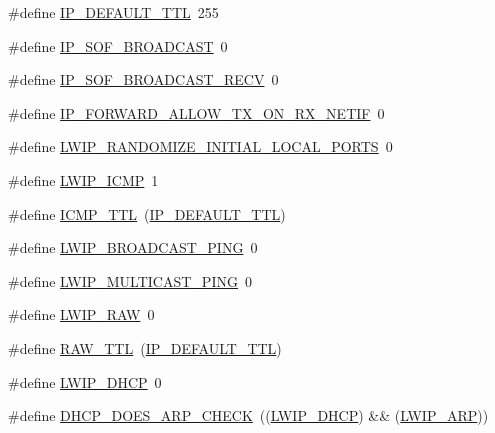 \begin{DoxyCompactItemize}
\#define \hyperlink{group__lwip__opts__ipv4_ga556b9b58fd02c0fdd126791baef77411}{I\+P\+\_\+\+D\+E\+F\+A\+U\+L\+T\+\_\+\+T\+TL}~255
\item 
\#define \hyperlink{group__lwip__opts__ipv4_ga0b2c993fd940f5774108298933310384}{I\+P\+\_\+\+S\+O\+F\+\_\+\+B\+R\+O\+A\+D\+C\+A\+ST}~0
\item 
\#define \hyperlink{group__lwip__opts__ipv4_ga0f1fbf42d3344bf87cd056d48ddca3db}{I\+P\+\_\+\+S\+O\+F\+\_\+\+B\+R\+O\+A\+D\+C\+A\+S\+T\+\_\+\+R\+E\+CV}~0
\item 
\#define \hyperlink{group__lwip__opts__ipv4_ga9e761df07c4e93901858741d4771dbc7}{I\+P\+\_\+\+F\+O\+R\+W\+A\+R\+D\+\_\+\+A\+L\+L\+O\+W\+\_\+\+T\+X\+\_\+\+O\+N\+\_\+\+R\+X\+\_\+\+N\+E\+T\+IF}~0
\item 
\#define \hyperlink{group__lwip__opts__ipv4_gafd988b31749b30c65009c8ddf6c0a58d}{L\+W\+I\+P\+\_\+\+R\+A\+N\+D\+O\+M\+I\+Z\+E\+\_\+\+I\+N\+I\+T\+I\+A\+L\+\_\+\+L\+O\+C\+A\+L\+\_\+\+P\+O\+R\+TS}~0
\item 
\#define \hyperlink{group__lwip__opts__icmp_gae4d45345c3ab8e5a355fda1d8d24fca6}{L\+W\+I\+P\+\_\+\+I\+C\+MP}~1
\item 
\#define \hyperlink{group__lwip__opts__icmp_gae1533f2bc39a5843989909555f6ce0cf}{I\+C\+M\+P\+\_\+\+T\+TL}~(\hyperlink{group__lwip__opts__ipv4_ga556b9b58fd02c0fdd126791baef77411}{I\+P\+\_\+\+D\+E\+F\+A\+U\+L\+T\+\_\+\+T\+TL})
\item 
\#define \hyperlink{group__lwip__opts__icmp_ga8088cb56d1a84fe554b11bc15d84b2b9}{L\+W\+I\+P\+\_\+\+B\+R\+O\+A\+D\+C\+A\+S\+T\+\_\+\+P\+I\+NG}~0
\item 
\#define \hyperlink{group__lwip__opts__icmp_gaf77baf0a83b04312eab4c006ef229661}{L\+W\+I\+P\+\_\+\+M\+U\+L\+T\+I\+C\+A\+S\+T\+\_\+\+P\+I\+NG}~0
\item 
\#define \hyperlink{group__lwip__opts__raw_gaca452be5cb05d9666f8f57e582c39221}{L\+W\+I\+P\+\_\+\+R\+AW}~0
\item 
\#define \hyperlink{group__lwip__opts__raw_ga36e3ffa66073ca0d27d11c422778249c}{R\+A\+W\+\_\+\+T\+TL}~(\hyperlink{group__lwip__opts__ipv4_ga556b9b58fd02c0fdd126791baef77411}{I\+P\+\_\+\+D\+E\+F\+A\+U\+L\+T\+\_\+\+T\+TL})
\item 
\#define \hyperlink{group__lwip__opts__dhcp_ga8a6ec62dc121064ac591b1fd8567bee9}{L\+W\+I\+P\+\_\+\+D\+H\+CP}~0
\item 
\#define \hyperlink{group__lwip__opts__dhcp_gab2d91de7b2fce879b0a213682e1b0b69}{D\+H\+C\+P\+\_\+\+D\+O\+E\+S\+\_\+\+A\+R\+P\+\_\+\+C\+H\+E\+CK}~((\hyperlink{openmote-cc2538_2lwip_2test_2unit_2lwipopts_8h_a8a6ec62dc121064ac591b1fd8567bee9}{L\+W\+I\+P\+\_\+\+D\+H\+CP}) \&\& (\hyperlink{group__lwip__opts__arp_ga9609a014bba4638cc191d6a8f9556c87}{L\+W\+I\+P\+\_\+\+A\+RP}))

\end{DoxyCompactItemize}

